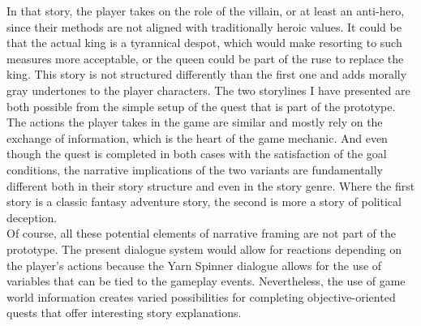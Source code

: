 In that story, the player takes on the role of the villain, or at least an anti-hero, since their methods are not aligned with traditionally heroic values. It could be that the actual king is a tyrannical despot, which would make resorting to such measures more acceptable, or the queen could be part of the ruse to replace the king. This story is not structured differently than the first one and adds morally gray undertones to the player characters. The two storylines I have presented are both possible from the simple setup of the quest that is part of the prototype. The actions the player takes in the game are similar and mostly rely on the exchange of information, which is the heart of the game mechanic. And even though the quest is completed in both cases with the satisfaction of the goal conditions, the narrative implications of the two variants are fundamentally different both in their story structure and even in the story genre. Where the first story is a classic fantasy adventure story, the second is more a story of political deception.\\
Of course, all these potential elements of narrative framing are not part of the prototype. The present dialogue system would allow for reactions depending on the player's actions because the Yarn Spinner dialogue allows for the use of variables that can be tied to the gameplay events. Nevertheless, the use of game world information creates varied possibilities for completing objective-oriented quests that offer interesting story explanations.\\
